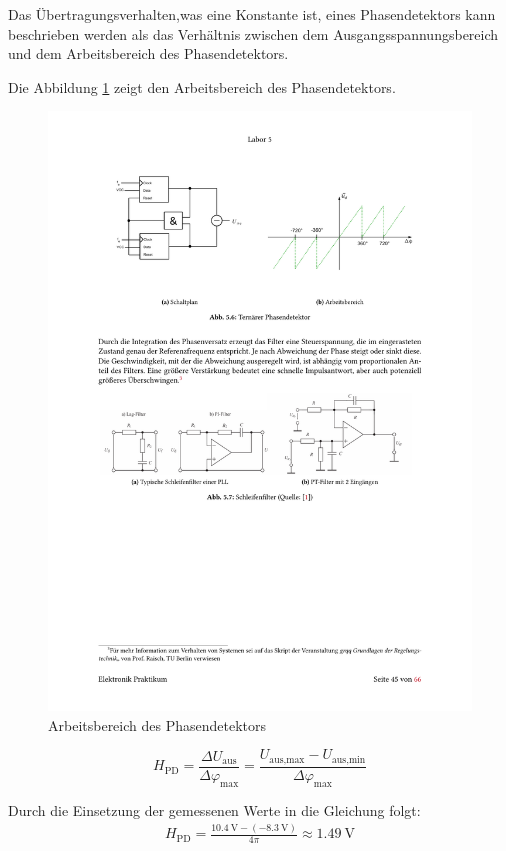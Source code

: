 Das Übertragungsverhalten,was eine Konstante ist, eines Phasendetektors kann beschrieben werden als das Verhältnis zwischen dem Ausgangsspannungsbereich und dem Arbeitsbereich des Phasendetektors. 

Die Abbildung \ref{fig:4pi} zeigt den Arbeitsbereich des Phasendetektors.
\begin{figure}[H]
  \centering
  \includegraphics[width=0.8\linewidth]{Elektronik-Laborprotokoll_PLL/Abbildungen/Geheimnis_4pi.pdf}
  \caption{Arbeitsbereich des Phasendetektors \cite{Skript}}
  \label{fig:4pi}
\end{figure}

\begin{equation}
H_{\text{PD}} = \frac{\Delta U_{\text{aus}}}{\Delta \varphi_{\text{max}}} = \frac{U_{\text{aus,max}} - U_{\text{aus,min}}}{\Delta \varphi_{\text{max}}}
\end{equation}

Durch die Einsetzung der gemessenen Werte in die Gleichung folgt:
\begin{align*}
H_{\text{PD}}=\frac{\SI{10,4}{\volt}-(\SI{-8,3}{\volt})}{4\pi}\approx \SI{1,49}{\volt}
\end{align*}





